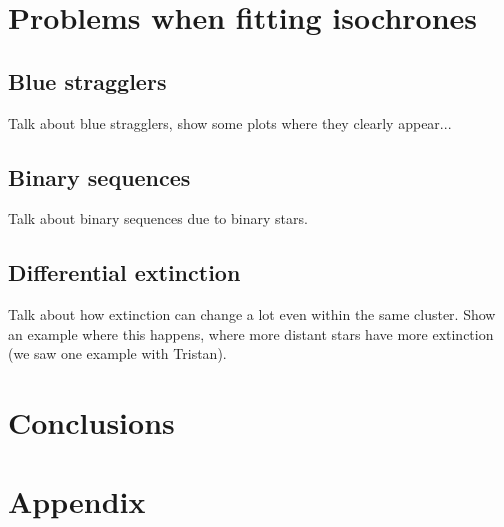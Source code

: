 \documentclass[twocolumn]{revtex4}
\begin{document}
\section{Problems when fitting isochrones}
\subsection{Blue stragglers}
Talk about blue stragglers, show some plots where they clearly appear...

\subsection{Binary sequences}
Talk about binary sequences due to binary stars.

\subsection{Differential extinction}
Talk about how extinction can change a lot even within the same cluster. Show an example where this happens, where more distant stars have more extinction (we saw one example with Tristan).

\section{Conclusions}


\section{Appendix}


\vspace*{0.5cm}
\begin{acknowledgments}

\end{acknowledgments}



\end{document}
